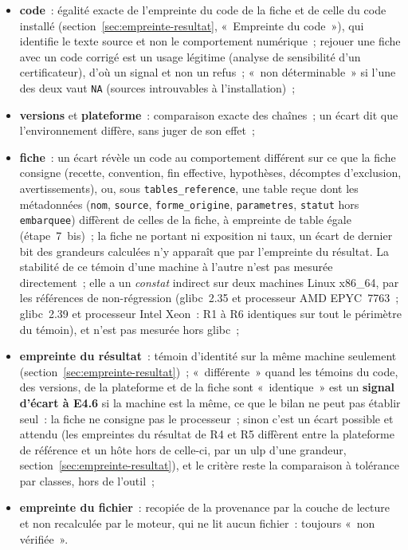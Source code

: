 \documentclass[a4paper,11pt]{article}
\newcommand{\code}[1]{\texttt{\small #1}}
\begin{document}
\begin{itemize}[leftmargin=*, itemsep=2pt]
  \item \textbf{code}~: égalité exacte de l'empreinte du code de la fiche et
    de celle du code installé (section~\ref{sec:empreinte-resultat},
    «~Empreinte du code~»), qui identifie le texte source et non le
    comportement numérique~; rejouer une fiche avec un code corrigé est un
    usage légitime (analyse de sensibilité d'un certificateur), d'où un
    signal et non un refus~; «~non déterminable~» si l'une des deux vaut
    \code{NA} (sources introuvables à l'installation)~;
  \item \textbf{versions} et \textbf{plateforme}~: comparaison exacte des
    chaînes~; un écart dit que l'environnement diffère, sans juger de son
    effet~;
  \item \textbf{fiche}~: un écart révèle un code au comportement différent
    sur ce que la fiche consigne (recette, convention, fin effective,
    hypothèses, décomptes d'exclusion, avertissements), ou, sous
    \code{tables\_reference}, une table reçue dont les métadonnées
    (\code{nom}, \code{source}, \code{forme\_origine}, \code{parametres},
    \code{statut} hors \code{embarquee}) diffèrent de celles de la fiche, à
    empreinte de table égale (étape~7~bis)~; la fiche ne portant
    ni exposition ni taux, un écart de dernier bit des grandeurs calculées
    n'y apparaît que par l'empreinte du résultat. La stabilité de ce témoin
    d'une machine à l'autre n'est pas mesurée directement~; elle a un
    \emph{constat} indirect sur deux machines Linux x86\_64, par les
    références de non-régression (glibc~2.35 et processeur AMD EPYC~7763~;
    glibc~2.39 et processeur Intel Xeon~: R1 à R6 identiques sur tout le
    périmètre du témoin), et n'est pas mesurée hors glibc~;
  \item \textbf{empreinte du résultat}~: témoin d'identité sur la même machine
    seulement (section~\ref{sec:empreinte-resultat})~; «~différente~» quand
    les témoins du code, des versions, de la plateforme et de la fiche sont
    «~identique~» est un \textbf{signal d'écart à E4.6} si la machine est la
    même, ce que le bilan ne peut pas établir seul~: la fiche ne consigne
    pas le processeur~; sinon c'est un écart
    possible et attendu (les empreintes du résultat de R4 et R5 diffèrent
    entre la plateforme de référence et un hôte hors de celle-ci, par un
    ulp d'une grandeur, section~\ref{sec:empreinte-resultat}),
    et le critère reste la comparaison à tolérance par classes, hors de
    l'outil~;
  \item \textbf{empreinte du fichier}~: recopiée de la provenance par la
    couche de lecture et non recalculée par le moteur, qui ne lit aucun
    fichier~: toujours «~non vérifiée~».
\end{itemize}
\end{document}
